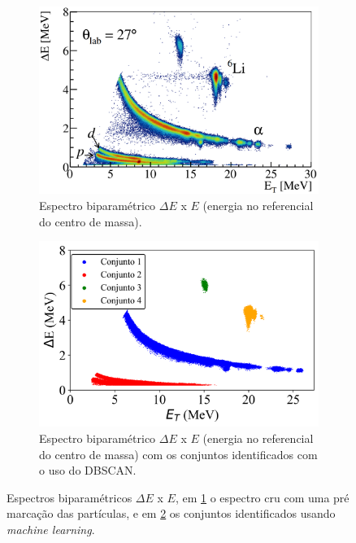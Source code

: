 \documentclass[a4paper,12pt,oneside]{book}
\begin{document}
\begin{figure}[H]
\centering
    \begin{subfigure}[t]{0.48\textwidth}
        \centering
        \includegraphics[scale=0.21]{figs/espectro_1.png}
        \caption{Espectro biparamétrico $\Delta E$ x $E$ (energia no referencial do centro de massa).}
        \label{subfig:espectro_1}
    \end{subfigure}%
    \hfill
    \begin{subfigure}[t]{0.48\textwidth}
        \centering
        \includegraphics[scale=0.52]{figs/espectro_2.png}
        \caption{Espectro biparamétrico $\Delta E$ x $E$ (energia no referencial do centro de massa) com os conjuntos identificados com o uso do DBSCAN.}
        \label{subfig:espectro_2}
    \end{subfigure}
\caption{Espectros biparamétricos $\Delta E$ x $E$, em \ref{subfig:espectro_1} o espectro cru com uma pré marcação das partículas, e em \ref{subfig:espectro_2} os conjuntos identificados usando \textit{machine learning}.}
\label{fig:espectros_ex_ml}
\end{figure}
\end{document}
